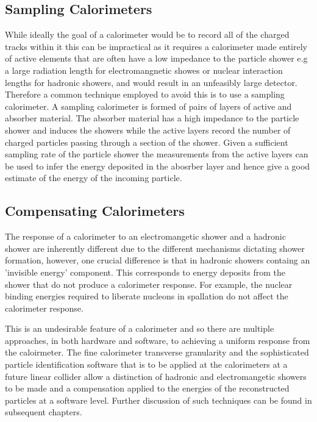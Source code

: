 \subsection{Sampling Calorimeters}
While ideally the goal of a calorimeter would be to record all of the charged tracks within it this can be impractical as it requires a calorimeter made entirely of active elements that are often have a low impedance to the particle shower e.g a large radiation length for electromangnetic showes or nuclear interaction lengths for hadronic showers, and would result in an unfeasibly large detector.  Therefore a common technique employed to avoid this is to use a sampling calorimeter.  A sampling calorimeter is formed of pairs of layers of active and absorber material.  The absorber material has a high impedance to the particle shower and induces the showers while the active layers record the number of charged particles passing through a section of the shower.  Given a sufficient sampling rate of the particle shower the measurements from the active layers can be used to infer the energy deposited in the abosrber layer and hence give a good estimate of the energy of the incoming particle.  

\subsection{Compensating Calorimeters}
The response of a calorimeter to an electromangetic shower and a hadronic shower are inherently different due to the different mechanisms dictating shower formation, however, one crucial difference is that in hadronic showers containg an 'invisible energy' component.  This corresponds to energy deposits from the shower that do not produce a calorimeter response.  For example, the nuclear binding energies required to liberate nucleons in spallation do not affect the calorimeter response.  

This is an undesirable feature of a calorimeter and so there are multiple approaches, in both hardware and software, to achieving a uniform response from the caloirmeter.  The fine calorimeter transverse granularity and the sophisticated particle identification software that is to be applied at the calorimeters at a future linear collider allow a distinction of hadronic and electromangetic showers to be made and a compensation applied to the energies of the reconstructed particles at a software level.  Further discussion of such techniques can be found in subsequent chapters. 

